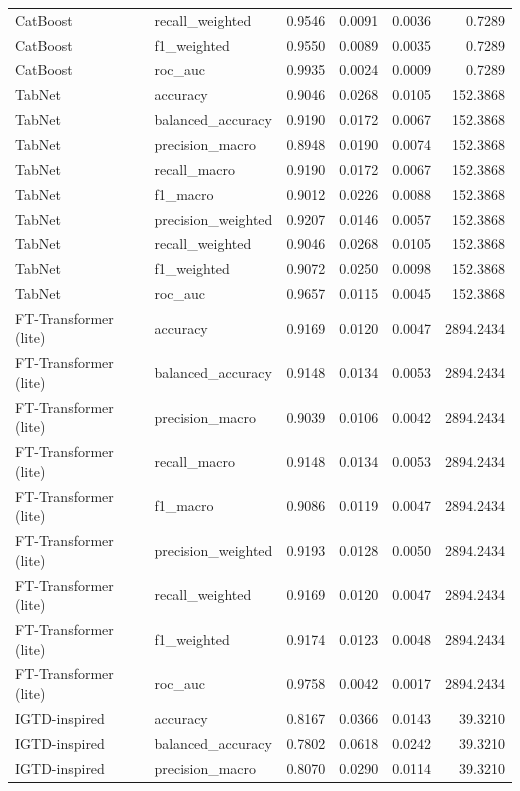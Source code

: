 \begin{tabular}{llrrrr}
CatBoost & recall_weighted & 0.9546 & 0.0091 & 0.0036 & 0.7289 \\
CatBoost & f1_weighted & 0.9550 & 0.0089 & 0.0035 & 0.7289 \\
CatBoost & roc_auc & 0.9935 & 0.0024 & 0.0009 & 0.7289 \\
TabNet & accuracy & 0.9046 & 0.0268 & 0.0105 & 152.3868 \\
TabNet & balanced_accuracy & 0.9190 & 0.0172 & 0.0067 & 152.3868 \\
TabNet & precision_macro & 0.8948 & 0.0190 & 0.0074 & 152.3868 \\
TabNet & recall_macro & 0.9190 & 0.0172 & 0.0067 & 152.3868 \\
TabNet & f1_macro & 0.9012 & 0.0226 & 0.0088 & 152.3868 \\
TabNet & precision_weighted & 0.9207 & 0.0146 & 0.0057 & 152.3868 \\
TabNet & recall_weighted & 0.9046 & 0.0268 & 0.0105 & 152.3868 \\
TabNet & f1_weighted & 0.9072 & 0.0250 & 0.0098 & 152.3868 \\
TabNet & roc_auc & 0.9657 & 0.0115 & 0.0045 & 152.3868 \\
FT-Transformer (lite) & accuracy & 0.9169 & 0.0120 & 0.0047 & 2894.2434 \\
FT-Transformer (lite) & balanced_accuracy & 0.9148 & 0.0134 & 0.0053 & 2894.2434 \\
FT-Transformer (lite) & precision_macro & 0.9039 & 0.0106 & 0.0042 & 2894.2434 \\
FT-Transformer (lite) & recall_macro & 0.9148 & 0.0134 & 0.0053 & 2894.2434 \\
FT-Transformer (lite) & f1_macro & 0.9086 & 0.0119 & 0.0047 & 2894.2434 \\
FT-Transformer (lite) & precision_weighted & 0.9193 & 0.0128 & 0.0050 & 2894.2434 \\
FT-Transformer (lite) & recall_weighted & 0.9169 & 0.0120 & 0.0047 & 2894.2434 \\
FT-Transformer (lite) & f1_weighted & 0.9174 & 0.0123 & 0.0048 & 2894.2434 \\
FT-Transformer (lite) & roc_auc & 0.9758 & 0.0042 & 0.0017 & 2894.2434 \\
IGTD-inspired & accuracy & 0.8167 & 0.0366 & 0.0143 & 39.3210 \\
IGTD-inspired & balanced_accuracy & 0.7802 & 0.0618 & 0.0242 & 39.3210 \\
IGTD-inspired & precision_macro & 0.8070 & 0.0290 & 0.0114 & 39.3210 \\

\end{tabular}
